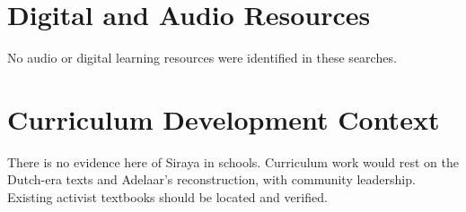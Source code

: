 \documentclass[12pt]{article}
\begin{document}
\section{Digital and Audio Resources}
No audio or digital learning resources were identified in these searches.

\section{Curriculum Development Context}
There is no evidence here of Siraya in schools. Curriculum work would rest on the Dutch-era texts and Adelaar's reconstruction, with community leadership. Existing activist textbooks should be located and verified.
\end{document}
